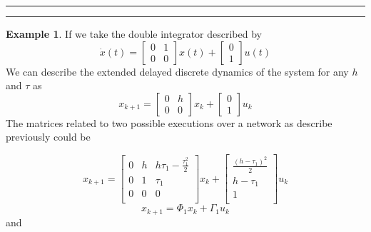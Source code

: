 \documentclass[nols]{tufte-handout}
\theoremstyle{definition}
\newtheorem{exmp}{Example}[section]
\begin{document}
\hrule
\hrule
\begin{exmp}
If we take the double integrator described by
\[
    \dot{x}(t)=\begin{bmatrix}
        0 & 1\\0 & 0
    \end{bmatrix}x(t)+\begin{bmatrix}
        0 \\ 1
    \end{bmatrix}u(t)
\]
We can describe the extended delayed discrete dynamics of the system for any $h$ and $\tau$ as 
\[
    x_{k+1}=\begin{bmatrix}
        0 & h\\0 & 0
    \end{bmatrix}x_{k}+\begin{bmatrix}
        0 \\ 1
    \end{bmatrix}u_{k}
\]
The matrices related to two possible executions over a network as describe previously could be

\[
    x_{k+1}=\begin{bmatrix}
        0 & h & h\tau_1-\frac{\tau_1^2}{2}\\
        0 & 1 & \tau_1\\
        0 & 0 & 0\\
    \end{bmatrix}x_{k}+\begin{bmatrix}
        \frac{(h - \tau_1)^2}{2} \\ 
        h-\tau_1\\
        1\\
    \end{bmatrix}u_{k}
\]
\[
    x_{k+1}=\Phi_1x_{k}+\Gamma_{1}u_k
\]
and


\end{exmp}
\end{document}
